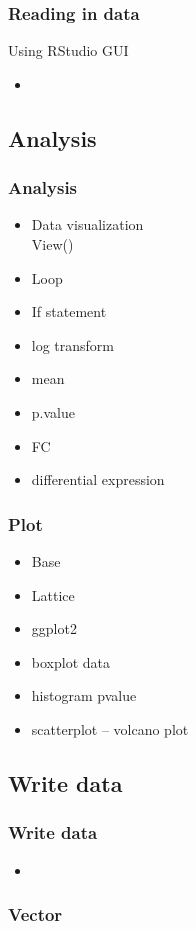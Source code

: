 \documentclass{beamer}
\begin{document}
\begin{frame}[fragile]
	\frametitle{Reading in data}
	\centering \Large Using RStudio GUI
	\begin{itemize}
		\small
		\item 
	\end{itemize}
\end{frame}

\subsection{Analysis}
\begin{frame}[fragile]
	\frametitle{Analysis}
	\centering \Large
	\begin{itemize}
		\small
		\item Data visualization\\View()
		\item Loop
		\item If statement
		\item log transform
		\item mean
		\item p.value
		\item FC
		\item differential expression
	\end{itemize}
\end{frame}

\begin{frame}[fragile]
	\frametitle{Plot}
	\centering \Large
	\begin{itemize}
		\small
		\item Base
		\item Lattice
		\item ggplot2
		\item boxplot data
		\item histogram pvalue
		\item scatterplot -- volcano plot
	\end{itemize}
\end{frame}

\subsection{Write data}
\begin{frame}[fragile]
	\frametitle{Write data}
	\centering \Large
	\begin{itemize}
		\small
		\item 
	\end{itemize}
\end{frame}




\begin{frame}[fragile]
	\frametitle{Vector}
\end{frame}
\end{document}
